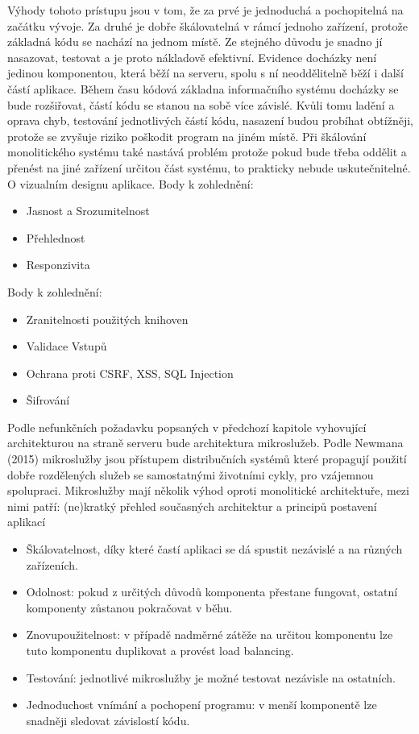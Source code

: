 \documentclass[12pt]{article}
\begin{document}
Výhody tohoto prístupu jsou v tom, že za prvé je jednoduchá a pochopitelná na
začátku vývoje. Za druhé je dobře škálovatelná v rámcí jednoho zařízení, protože základná
kódu se nachází na jednom místě. Ze stejného důvodu je snadno jí nasazovat, testovat a je
proto nákladově efektivní.
Evidence docházky není jedinou komponentou, která běží na serveru, spolu s ní
neoddělitelně běží i další částí aplikace. Během času kódová základna informačního systému
docházky se bude rozšiřovat, částí kódu se stanou na sobě více závislé. Kvůli tomu ladění a
oprava chyb, testování jednotlivých částí kódu, nasazení budou probíhat obtížněji, protože se
zvyšuje riziko poškodit program na jiném místě. Při škálování monolitického systému také
nastává problém protože pokud bude třeba oddělit a přenést na jiné zařízení určitou část
systému, to prakticky nebude uskutečnitelné.
O vizualním designu aplikace. Body k zohlednění:
\begin{itemize}
    \item Jasnost a Srozumitelnost
    \item Přehlednost
    \item Responzivita
\end{itemize}
Body k zohlednění:
\begin{itemize}
    \item Zranitelnosti použitých knihoven
    \item Validace Vstupů
    \item Ochrana proti CSRF, XSS, SQL Injection
    \item Šifrování
\end{itemize}
    Podle nefunkčních požadavku popsaných v předchozí kapitole vyhovující
    architekturou na straně serveru bude architektura mikroslužeb. Podle Newmana (2015) mikroslužby jsou
    přístupem distribučních systémů které propagují použití dobře rozdělených služeb se
    samostatnými životními cykly, pro vzájemnou spolupraci. Mikroslužby mají několik výhod
    oproti monolitické architektuře, mezi nimi patří:
    (ne)kratký přehled současných architektur a principů postavení aplikací
\begin{itemize}
    \item Škálovatelnost, díky které častí aplikaci se dá spustit nezávislé a na různých
    zařízeních.
    \item Odolnost: pokud z určitých důvodů komponenta přestane fungovat, ostatní
    komponenty zůstanou pokračovat v běhu.
    \item Znovupoužitelnost: v případě nadměrné zátěže na určitou komponentu lze tuto
    komponentu duplikovat a provést load balancing.
    \item Testování: jednotlivé mikroslužby je možné testovat nezávisle na ostatních.
    \item Jednoduchost vnímání a pochopení programu: v menší komponentě lze snadněji
    sledovat závislostí kódu.
\end{itemize}
\end{document}
